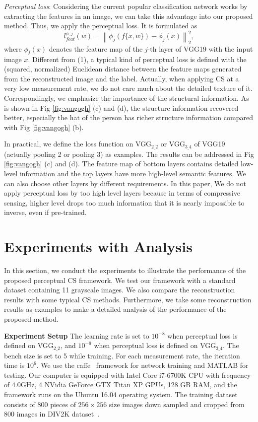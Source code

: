 \documentclass[runningheads]{llncs}
\begin{document}
\emph{Perceptual loss}: Considering the current popular classification network works by extracting the features in an image, we can take this advantage into our proposed method. Thus, we apply the perceptual loss.
It is formulated as
\begin{equation}
  l_{feat}^{\phi,j}(w)=\left \| \phi_j(f\{x,w\})-\phi_j(x) \right \|_2^2,
\end{equation}
where $\phi$$_j(x)$ denotes the feature map of the $j$-th layer of VGG19 with the input image $x$.
Different from (1), a typical kind of perceptual loss is defined with the (squared, normalized) Euclidean distance %
between the feature maps generated from the reconstructed image and the label.
Actually, when applying CS at a very low measurement rate, we do not care much about the detailed texture of it.
Correspondingly, we emphasize the importance of the structural information. As is shown in Fig \ref{fig:vangogh} (c) and (d), the structure information recovered better, especially the hat of the person has richer structure information compared with Fig \ref{fig:vangogh} (b).

In practical, we define the loss function on VGG$_{2\_2}$ or VGG$_{3\_4}$ of VGG19 (actually pooling 2 or pooling 3) as examples. The results can be addressed in Fig \ref{fig:vangogh} (c) and (d). The feature map of bottom layers contains detailed low-level information and the top layers have more high-level semantic features. We can also choose other layers by different requirements. In this paper, We do not apply perceptual loss by too high level layers because in terms of compressive sensing, higher level drops too much information that it is nearly impossible to inverse, even if pre-trained.

\section{Experiments with Analysis}

In this section, we conduct the experiments to illustrate the performance of the proposed perceptual CS framework. We test our framework with a standard dataset \cite{Kulkarni2016ReconNet} containing 11 grayscale images.
We also compare the reconstruction results with some typical CS methods. Furthermore, we take some reconstruction results as examples to make a detailed analysis of the performance of the proposed method.

{\bf Experiment Setup}
The learning rate is set to $10^{-8}$ when perceptual loss is defined on VGG$_{2\_2}$, and $10^{-9}$ when perceptual loss is defined on VGG$_{3\_4}$. The bench size is set to 5 while training. For each measurement rate, the iteration time is $10^{6}$. We use the caffe~\cite{Jia2014Caffe} framework for network training and MATLAB for testing. Our computer is equipped with Intel Core i7-6700K CPU with frequency of 4.0GHz, 4 NVidia GeForce GTX Titan XP GPUs, 128 GB RAM, and the framework runs on the Ubuntu 16.04 operating system. The training dataset consists of 800 pieces of $256\times 256$ size images down sampled and cropped from 800 images in DIV2K dataset~\cite{agustsson2017ntire}.
\end{document}
